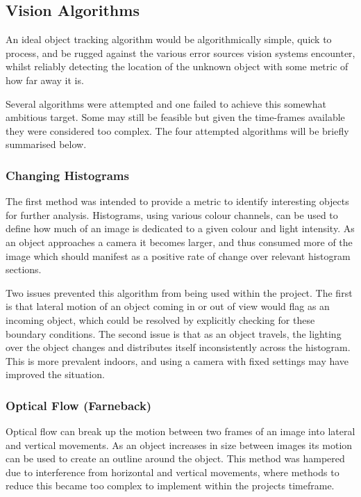\documentclass[conference]{IEEEtran}
\begin{document}
\subsection{Vision Algorithms}
An ideal object tracking algorithm would be algorithmically simple, quick to process, and be rugged against the various error sources vision systems encounter, whilst reliably detecting the location of the unknown object with some metric of how far away it is.

Several algorithms were attempted and one failed to achieve this somewhat ambitious target. Some may still be feasible but given the time-frames available they were considered too complex. The four attempted algorithms will be briefly summarised below.

\subsubsection{Changing Histograms}
The first method was intended to provide a metric to identify interesting objects for further analysis. Histograms, using various colour channels, can be used to define how much of an image is dedicated to a given colour and light intensity. As an object approaches a camera it becomes larger, and thus consumed more of the image which should manifest as a positive rate of change over relevant histogram sections.

Two issues prevented this algorithm from being used within the project. The first is that lateral motion of an object coming in or out of view would flag as an incoming object, which could be resolved by explicitly checking for these boundary conditions. The second issue is that as an object travels, the lighting over the object changes and distributes itself inconsistently across the histogram. This is more prevalent indoors, and using a camera with fixed settings may have improved the situation.

\subsubsection{Optical Flow (Farneback)}
Optical flow can break up the motion between two frames of an image into lateral and vertical movements. As an object increases in size between images its motion can be used to create an outline around the object. This method was hampered due to interference from horizontal and vertical movements, where methods to reduce this became too complex to implement within the projects timeframe.
\end{document}
